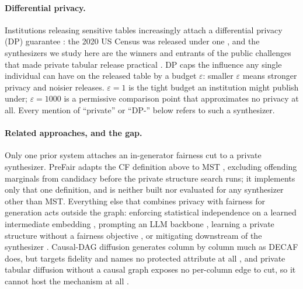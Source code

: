 \documentclass{article}
\begin{document}
\paragraph{Differential privacy.}
Institutions releasing sensitive tables increasingly attach a differential
privacy (DP) guarantee \citep{dwork2006calibrating}: the 2020 US Census was
released under one \citep{abowd2022topdown}, and the synthesizers we study
here are the winners and entrants of the public challenges that made private
tabular release practical \citep{nist2018challenge,mckenna2021mst,vos2024}.
DP caps the influence any single individual can have on the released table by
a budget $\varepsilon$: smaller $\varepsilon$ means stronger privacy and
noisier releases. $\varepsilon{=}1$ is the tight budget an institution might
publish under; $\varepsilon{=}1000$ is a permissive comparison point that
approximates no privacy at all. Every mention of ``private'' or ``DP-''
below refers to such a synthesizer.

\paragraph{Related approaches, and the gap.}
Only one prior system attaches an in-generator fairness cut to a private
synthesizer. PreFair \citep{pujol2023prefair} adapts the CF definition above
to MST \citep{mckenna2021mst}, excluding offending marginals from candidacy
before the private structure search runs; it implements only that one
definition, and is neither built nor evaluated for any synthesizer other than
MST. Everything else that combines privacy with fairness for generation acts
outside the graph: enforcing statistical independence on a learned
intermediate embedding \citep{hyrup2025flip,sarmin2025pfwgan}, prompting an
LLM backbone \citep{nagesh2025faircausesyn}, learning a private structure
without a fairness objective \citep{jia2025pradagan}, or mitigating
downstream of the synthesizer \citep{angelozzi2026where}. Causal-DAG
diffusion generates column by column much as DECAF does, but targets fidelity
and names no protected attribute at all
\citep{zhang2025causaldifftab,jacob2026tabscm}, and private tabular diffusion
without a causal graph exposes no per-column edge to cut, so it cannot host
the mechanism at all \citep{zhu2024dptldm}.
\end{document}
